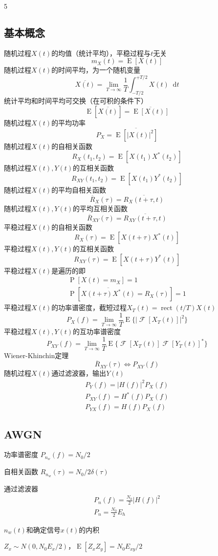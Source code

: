 \documentclass[8pt, a4paper]{extarticle}
\newcommand*{\dif}{\mathop{}\!\mathrm{d}}
\DeclareMathOperator{\rect}{rect}
\DeclareMathOperator{\E}{E}
\DeclareMathOperator{\prob}{P}
\DeclareMathOperator{\fourier}{\mathcal{F}}
\begin{document}
\begin{multicols}{5}
\subsection{基本概念}
随机过程\(X(t)\)的均值（统计平均），平稳过程与\(t\)无关
\[
m_X(t) = \E[X(t)]
\]
随机过程\(X(t)\)的时间平均，为一个随机变量
\[
\overline{X(t)} = \lim_{T\to \infty}\frac{1}{T}\int_{-T/2}^{+T/2}X(t)\dif t
\]
统计平均和时间平均可交换（在可积的条件下）
\[
\E[\overline{X(t)}] = \overline{\E[X(t)]}
\]
随机过程\(X(t)\)的平均功率
\[
P_X=\overline{\E[|X(t)|^2]}
\]
随机过程\(X(t)\)的自相关函数
\[
R_X(t_1,t_2) = \E[X(t_1)X^*(t_2)]
\]
随机过程\(X(t),Y(t)\)的互相关函数
\[
R_{XY}(t_1,t_2) = \E[X(t_1)Y^*(t_2)]
\]
随机过程\(X(t)\)的平均自相关函数
\[
\overline{R}_X(\tau) = \overline{R_X(t+\tau,t)}
\]
随机过程\(X(t),Y(t)\)的平均互相关函数
\[
\overline{R}_{XY}(\tau) = \overline{R_{XY}(t+\tau,t)}
\]
平稳过程\(X(t)\)的自相关函数
\[
R_{X}(\tau) = \E[X(t+\tau)X^*(t)]
\]
平稳过程\(X(t),Y(t)\)的互相关函数
\[
R_{XY}(\tau) = \E[X(t+\tau)Y^*(t)]
\]
平稳过程\(X(t)\)是遍历的即
\begin{gather*}
\prob[X(t)=m_X]=1\\
\prob[\overline{X(t+\tau)X^*(t)}=R_X(\tau)]=1
\end{gather*}
平稳过程\(X(t)\)的功率谱密度，截短过程\(X_T(t)=\rect(t/T) X(t)\)
\[
P_X(f) = \lim_{T\to \infty}\frac{1}{T}\E\{|\fourier[X_T(t)]|^2\}
\]
平稳过程\(X(t),Y(t)\)的互功率谱密度
\[
P_{XY}(f) = \lim_{T\to \infty}\frac{1}{T}\E\{\fourier[X_T(t)]{\fourier[Y_T(t)]}^*\}
\]
Wiener-Khinchin定理
\[
\overline{R}_{XY}(\tau) \Leftrightarrow P_{XY}(f)
\]
随机过程\(X(t)\)通过滤波器，输出\(Y(t)\)
\begin{gather*}
P_Y(f) = |H(f)|^2P_X(f)\\
P_{XY}(f) = H^*(f)P_X(f)\\
P_{YX}(f) = H(f)P_X(f)
\end{gather*}
\subsection{AWGN}
功率谱密度
\(
P_{n_w}(f) = N_0/2
\)

自相关函数
\(
R_{n_w}(\tau) =N_0/2\delta(\tau)
\)

通过滤波器
\begin{gather*}
P_n(f)=\frac{N_0}{2}|H(f)|^2\\
P_n = \frac{N_0}{2}E_h
\end{gather*}

\(n_w(t)\)和确定信号\(x(t)\)的内积

\(Z_x\sim N(0,N_0E_x/2)\)，\(\E[Z_x Z_y] = N_0E_{xy}/2\)


\end{multicols}
\end{document}
